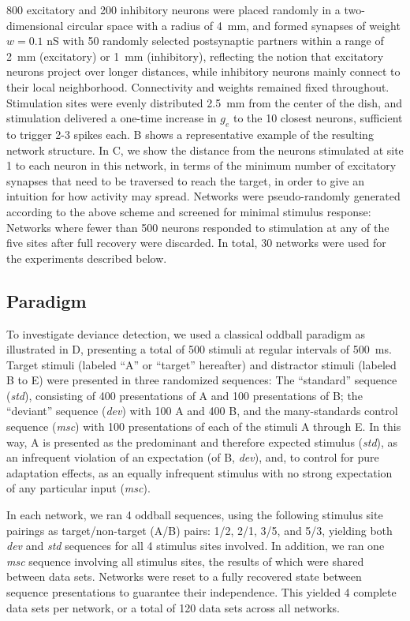 \documentclass[9pt,lineno,onehalfspacing]{elife}
\newcommand{\dev}{\textit{dev}}
\newcommand{\msc}{\textit{msc}}
\newcommand{\std}{\textit{std}}
\begin{document}
800 excitatory and 200 inhibitory neurons were placed randomly in a two-dimensional circular space with a radius of 4~mm, and formed synapses of weight $w = 0.1$ nS with 50 randomly selected postsynaptic partners within a range of 2~mm (excitatory) or 1~mm (inhibitory), reflecting the notion that excitatory neurons project over longer distances, while inhibitory neurons mainly connect to their local neighborhood. Connectivity and weights remained fixed throughout. Stimulation sites were evenly distributed 2.5~mm from the center of the dish, and stimulation delivered a one-time increase in $g_e$ to the 10 closest neurons, sufficient to trigger 2-3 spikes each. B shows a representative example of the resulting network structure. In C, we show the distance from the neurons stimulated at site 1 to each neuron in this network, in terms of the minimum number of excitatory synapses that need to be traversed to reach the target, in order to give an intuition for how activity may spread. Networks were pseudo-randomly generated according to the above scheme and screened for minimal stimulus response: Networks where fewer than 500 neurons responded to stimulation at any of the five sites after full recovery were discarded. In total, 30 networks were used for the experiments described below.

\subsection{Paradigm}\label{sec:paradigm}

To investigate deviance detection, we used a classical oddball paradigm as illustrated in D, presenting a total of 500 stimuli at regular intervals of 500~ms. Target stimuli (labeled ``A'' or ``target'' hereafter) and distractor stimuli (labeled B to E) were presented in three randomized sequences: The ``standard'' sequence (\std{}), consisting of 400 presentations of A and 100 presentations of B; the ``deviant'' sequence (\dev{}) with 100 A and 400 B, and the many-standards control sequence (\msc{}) with 100 presentations of each of the stimuli A through E. In this way, A is presented as the predominant and therefore expected stimulus (\std{}), as an infrequent violation of an expectation (of B, \dev{}), and, to control for pure adaptation effects, as an equally infrequent stimulus with no strong expectation of any particular input (\msc{}).

In each network, we ran 4 oddball sequences, using the following stimulus site pairings as target/non-target (A/B) pairs: 1/2, 2/1, 3/5, and 5/3, yielding both \dev{} and \std{} sequences for all 4 stimulus sites involved. In addition, we ran one \msc{} sequence involving all stimulus sites, the results of which were shared between data sets. Networks were reset to a fully recovered state between sequence presentations to guarantee their independence. This yielded 4 complete data sets per network, or a total of 120 data sets across all networks.
\end{document}

